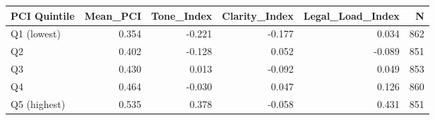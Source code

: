 \begin{tabular}{lrrrrr}
\toprule
PCI Quintile & Mean_PCI & Tone_Index & Clarity_Index & Legal_Load_Index & N \\
\midrule
Q1 (lowest) & 0.354 & -0.221 & -0.177 & 0.034 & 862 \\
Q2 & 0.402 & -0.128 & 0.052 & -0.089 & 851 \\
Q3 & 0.430 & 0.013 & -0.092 & 0.049 & 853 \\
Q4 & 0.464 & -0.030 & 0.047 & 0.126 & 860 \\
Q5 (highest) & 0.535 & 0.378 & -0.058 & 0.431 & 851 \\
\bottomrule
\end{tabular}
